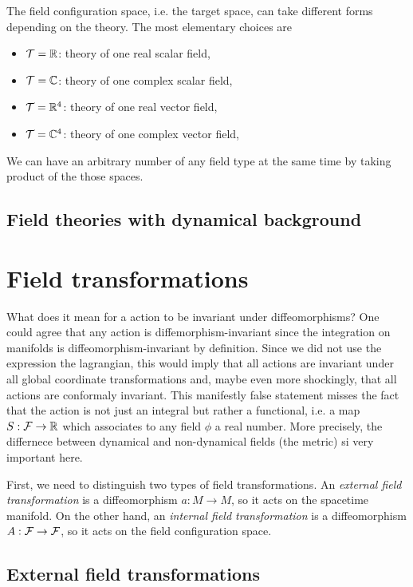\documentclass[a4paper,10pt]{article}
\begin{document}
        The field configuration space, i.e. the target space, can take different forms depending on the theory. The most elementary choices are
        \begin{itemize}
            \item $\mathcal{T}=\mathbb{R}$: theory of one real scalar field,
            \item $\mathcal{T}=\mathbb{C}$: theory of one complex scalar field,
            \item $\mathcal{T}=\mathbb{R}^4$: theory of one real vector field,
            \item $\mathcal{T}=\mathbb{C}^4$: theory of one complex vector field,
        \end{itemize}
        We can have an arbitrary number of any field type at the same time by taking product of the those spaces.

    \subsection{Field theories with dynamical background}

\section{Field transformations}

    What does it mean for a action to be invariant under diffeomorphisms? One could agree that any action is diffemorphism-invariant since the integration on manifolds is diffeomorphism-invariant by definition. Since we did not use the expression the lagrangian, this would imply that all actions are invariant under all global coordinate transformations and, maybe even more shockingly, that all actions are conformaly invariant. This manifestly false statement misses the fact that the action is not just an integral but rather a functional, i.e. a map $S:\mathcal{F}\to\mathbb{R}$ which associates to any field $\phi$ a real number. More precisely, the differnece between dynamical and non-dynamical fields (the metric) si very important here.

    First, we need to distinguish two types of field transformations. An \emph{external field transformation} is a diffeomorphism $a:M\to M$, so it acts on the spacetime manifold. On the other hand, an \emph{internal field transformation} is a diffeomorphism $A:\mathcal{F}\to\mathcal{F}$, so it acts on the field configuration space.

    \subsection{External field transformations}
\end{document}
